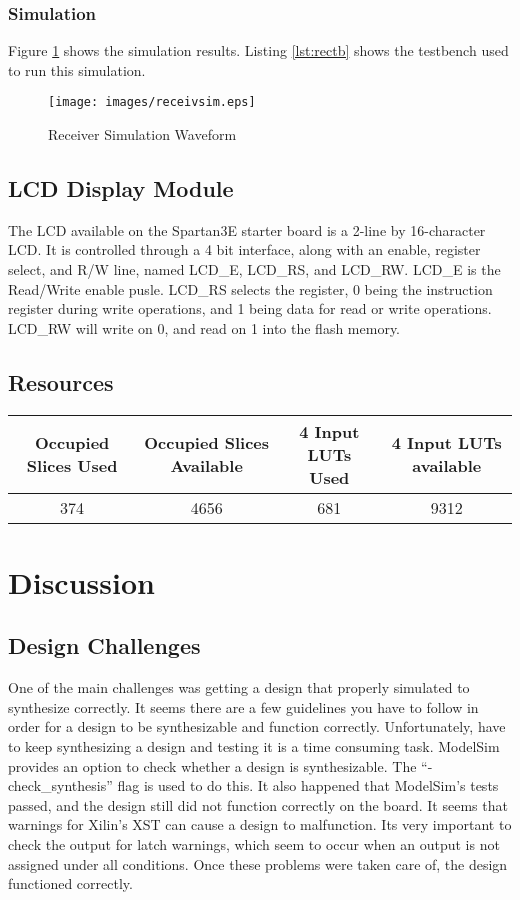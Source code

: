\documentclass[12pt, a4paper]{article}
\begin{document}
\subsubsection{Simulation}
Figure \ref{fig:recsim} shows the simulation results. Listing \ref{lst:rectb} shows the testbench
used to run this simulation.
\begin{figure}[H]
  \centering
  \texttt{[image: images/receivsim.eps]}
  \caption{Receiver Simulation Waveform}
  \label{fig:recsim}
\end{figure}

\subsection{LCD Display Module}
The LCD available on the Spartan3E starter board is a 2-line by 16-character LCD. It is controlled through
a 4 bit interface, along with an enable, register select, and R/W line, named LCD\_E, LCD\_RS, and LCD\_RW.
LCD\_E is the Read/Write enable pusle. LCD\_RS selects the register, 0 being the instruction register during
write operations, and 1 being data for read or write operations. LCD\_RW will write on 0, and read on 1 into
the flash  memory.\cite{xilinxug}

\subsection{Resources}
\begin{tabular}{c | c | c | c}
  Occupied Slices Used & Occupied Slices Available & 4 Input LUTs Used & 4 Input LUTs available \\ \hline
  374 & 4656 & 681 & 9312 \\
\end{tabular}
\section{Discussion}
\subsection{Design Challenges}
One of the main challenges was getting a design that properly simulated to synthesize correctly. It seems there are
a few guidelines you have to follow in order for a design to be synthesizable and function correctly. Unfortunately,
have to keep synthesizing a design and testing it is a time consuming task. ModelSim provides an option to check
whether a design is synthesizable.\cite{modelsim} The ``-check\_synthesis'' flag is used to do this. It also happened that 
ModelSim's tests passed, and the design still did not function correctly on the board. It seems that warnings for
Xilin's XST can cause a design to malfunction. Its very important to check the output for latch warnings, which
seem to occur when an output is not assigned under all conditions.\cite{xilinx} Once these problems were taken care of, the
design functioned correctly.
\end{document}
